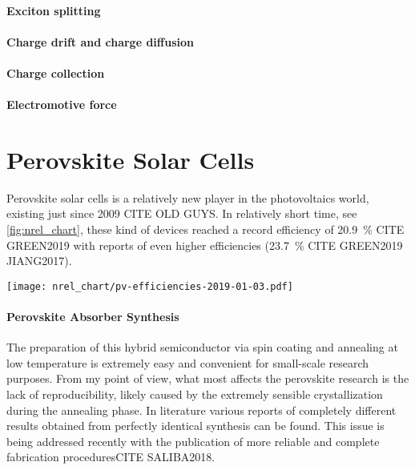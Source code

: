 	\paragraph{Exciton splitting}

	\paragraph{Charge drift and charge diffusion}

	\paragraph{Charge collection}

	\paragraph{Electromotive force}

\section{Perovskite Solar Cells}

	Perovskite solar cells is a relatively new player in the photovoltaics world, existing just since 2009 CITE OLD GUYS. In relatively short time, see \cref{fig:nrel_chart}, these kind of devices reached a record efficiency of 20.9~\% CITE GREEN2019 with reports of even higher efficiencies (23.7~\% CITE GREEN2019 JIANG2017).
	
	
	\begin{SCfigure}
		\centering
		\texttt{[image: nrel\_chart/pv-efficiencies-2019-01-03.pdf]}
		\label{fig:nrel_chart}
	\end{SCfigure}


	\paragraph{Perovskite Absorber Synthesis}
	
		The preparation of this hybrid semiconductor via spin coating and annealing at low temperature is extremely easy and convenient for small-scale research purposes. From my point of view, what most affects the perovskite research is the lack of reproducibility, likely caused by the extremely sensible crystallization during the annealing phase. In literature various reports of completely different results obtained from perfectly identical synthesis can be found\cite{Pockett2015,Gottesman2014}. This issue is being addressed recently with the publication of more reliable and complete fabrication proceduresCITE SALIBA2018.

